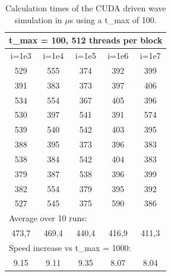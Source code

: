 \documentclass[a4paper]{article}
\begin{document}
		\begin{table}[H]
			\caption{Calculation times of the CUDA driven wave simulation in $\mu$s using a t\_max of 100.}
			\label{table:iChange100}
			\begin{center}
				\begin{tabular}{| c | c | c | c | c |}
					\hline
					\multicolumn{5}{|l|}{t\_max = 100, 512 threads per block}\\
					\hline
					i=1e3 & i=1e4 & i=1e5 & i=1e6 & i=1e7\\ 
					\hline
					529 & 555 & 374 & 392 & 399\\ 
					\hline
					391 & 383 & 373 & 397 & 406\\ 
					\hline
					534 & 554 & 367 & 405 & 396\\ 
					\hline
					530 & 397 & 541 & 391 & 574\\ 
					\hline
					539 & 540 & 542 & 403 & 395\\ 
					\hline
					388 & 395 & 373 & 396 & 383\\ 
					\hline
					538 & 384 & 542 & 404 & 383\\ 
					\hline
					379 & 387 & 538 & 396 & 399\\ 
					\hline
					382 & 554 & 379 & 395 & 392\\ 
					\hline
					527 & 545 & 375 & 590 & 386\\ 
					\hline
					\multicolumn{5}{|l|}{Average over 10 runs:}\\
					\hline
					473,7 & 469,4 & 440,4 & 416,9 & 411,3\\ 
					\hline
					\multicolumn{5}{|l|}{Speed increase vs t\_max = 1000:}\\
					\hline
					9.15 & 9.11 & 9.35 & 8.07 & 8.04\\
					\hline
				\end{tabular}
			\end{center}
		\end{table}
		
\end{document}

